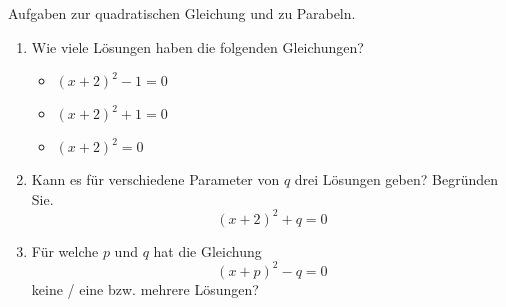 



\usepackage{cancel}


\newcommand\Ccancel[2][black]{\renewcommand\CancelColor{\color{#1}}\cancel{#2}}
\renewcommand{\metaHeaderLine}{Arbeitsblatt}
\renewcommand{\arbeitsblattTitel}{Photomat und quadratische Funktionen}

\arbeitsblattHeader{}

Aufgaben zur quadratischen Gleichung und zu Parabeln.

\begin{enumerate}
\item Wie viele Lösungen haben die folgenden Gleichungen?
 \begin{itemize}
  \item $(x+2)^2 - 1 = 0$
  \item $(x+2)^2 + 1 = 0$
  \item $(x+2)^2     = 0$
 \end{itemize}

\item Kann es für verschiedene Parameter von $q$ drei Lösungen geben?
  Begründen Sie.
  $$(x+2)^2+q = 0$$

\item Für welche $p$ und $q$ hat die Gleichung
$$(x+p)^2-q = 0$$
keine / eine bzw. mehrere Lösungen?
\end{enumerate}


